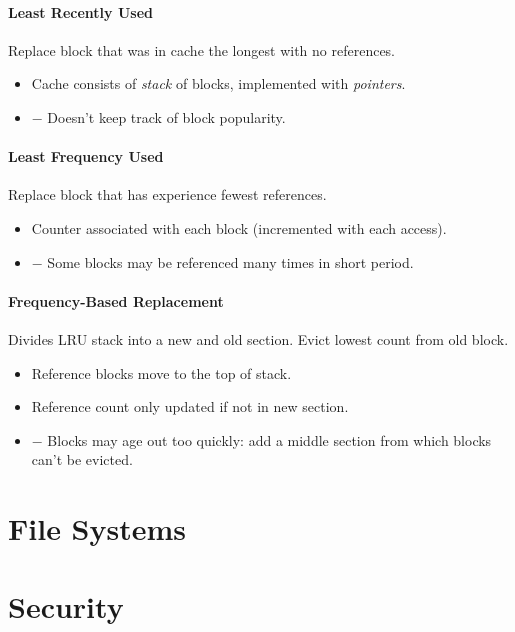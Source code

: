 \documentclass[twocolumn,english]{article}
\begin{document}
\paragraph{Least Recently Used}

Replace block that was in cache the longest with no references.
\begin{itemize}
\item Cache consists of \emph{stack} of blocks, implemented with \emph{pointers}.
\item $-$ Doesn't keep track of block popularity.
\end{itemize}

\paragraph{Least Frequency Used}

Replace block that has experience fewest references.
\begin{itemize}
\item Counter associated with each block (incremented with each access).
\item $-$ Some blocks may be referenced many times in short period.
\end{itemize}

\paragraph{Frequency-Based Replacement}

Divides LRU stack into a new and old section. Evict lowest count from
old block.
\begin{itemize}
\item Reference blocks move to the top of stack.
\item Reference count only updated if not in new section.
\item $-$ Blocks may age out too quickly: add a middle section from which
blocks can't be evicted.
\end{itemize}

\section{File Systems}

\section{Security}
\end{document}
